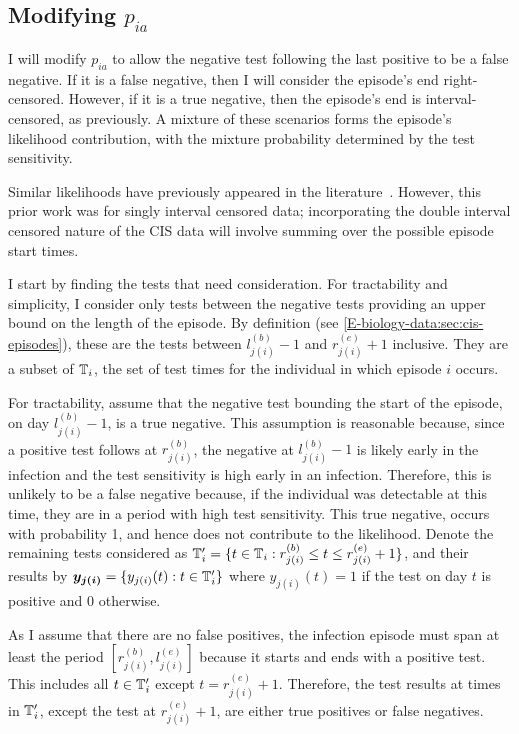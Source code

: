 \documentclass[thesis.tex]{subfiles}
\begin{document}
\subsection{Modifying \texorpdfstring{$p_{ia}$}{pia}} \label{imperf-test:sec:modifying-p_ia}

I will modify $p_{ia}$ to allow the negative test following the last positive to be a false negative.
If it is a false negative, then I will consider the episode's end right-censored.
However, if it is a true negative, then the episode's end is interval-censored, as previously.
A mixture of these scenarios forms the episode's likelihood contribution, with the mixture probability determined by the test sensitivity.

Similar likelihoods have previously appeared in the literature~\autocite[e.g.][eq.\ (2)]{piresIntervalMisclassify}.
However, this prior work was for singly interval censored data; incorporating the double interval censored nature of the CIS data will involve summing over the possible episode start times.

I start by finding the tests that need consideration.
For tractability and simplicity, I consider only tests between the negative tests providing an upper bound on the length of the episode.
By definition (see \cref{E-biology-data:sec:cis-episodes}), these are the tests between $l_{j(i)}^{(b)} - 1$ and $r_{j(i)}^{(e)} + 1$ inclusive.
They are a subset of $\mathbb{T}_i$, the set of test times for the individual in which episode $i$ occurs.

For tractability, assume that the negative test bounding the start of the episode, on day $l_{j(i)}^{(b)}-1$, is a true negative.
This assumption is reasonable because, since a positive test follows at $r_{j(i)}^{(b)}$, the negative at $l_{j(i)}^{(b)}-1$ is likely early in the infection and the test sensitivity is high early in an infection.
Therefore, this is unlikely to be a false negative because, if the individual was detectable at this time, they are in a period with high test sensitivity.
This true negative, occurs with probability 1, and hence does not contribute to the likelihood.
Denote the remaining tests considered as $\mathbb{T}'_i = \{ t \in \mathbb{T}_i : r_{j(i)}^{(b)} \leq t \leq r_{j(i)}^{(e)} + 1 \}$, and their results by $\bm{y_{j(i)}} = \{ y_{j(i)}(t) : t \in \mathbb{T}'_i \}$ where $y_{j(i)}(t) = 1$ if the test on day $t$ is positive and 0 otherwise.

As I assume that there are no false positives, the infection episode must span at least the period $[r^{(b)}_{j(i)}, l^{(e)}_{j(i)}]$ because it starts and ends with a positive test.
This includes all $t \in \mathbb{T}'_i$ except $t = r_{j(i)}^{(e)}+1$.
Therefore, the test results at times in $\mathbb{T}_i'$, except the test at $r_{j(i)}^{(e)}+1$, are either true positives or false negatives.
\end{document}
